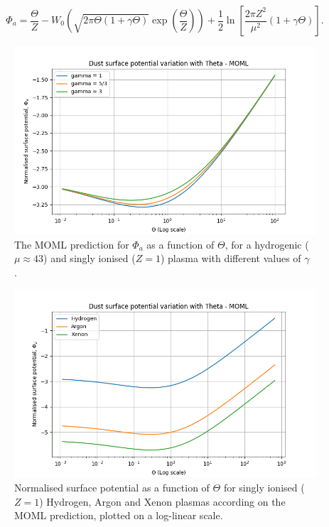 \documentclass{article}
\begin{document}
\begin{equation}\label{eq:MOMLsol}
\Phi_a =  \frac{\Theta}{Z} - W_{0}\left(\sqrt{2\pi \Theta (1 + \gamma \Theta)} \exp{\left (\frac{\Theta}{Z}\right)}\right) + \frac{1}{2}\ln{\left[\frac{2\pi Z^2}{\mu^2}(1 + \gamma \Theta)\right]}.
\end{equation}

\newpage

\begin{figure}[H]
\centering
\includegraphics[width=\linewidth]{Output/MOMLgamma.jpeg}
\caption{The MOML prediction for  $\Phi_a$ as a function of $\Theta$, for a hydrogenic ($\mu \approx 43$) and singly ionised ($Z = 1$) plasma with different values of $\gamma$ \cite{Thomas}.}
\label{MOMLgamma} 
\end{figure}

\begin{figure}[H]
\centering
\includegraphics[width=\linewidth]{Output/MOMLgraph.jpeg}
\caption{Normalised surface potential as a function of $\Theta$ for singly ionised ($Z = 1$) Hydrogen, Argon and Xenon plasmas according on the MOML prediction, plotted on a log-linear scale.}
\label{MOMLgraph} 
\end{figure}
\end{document}
